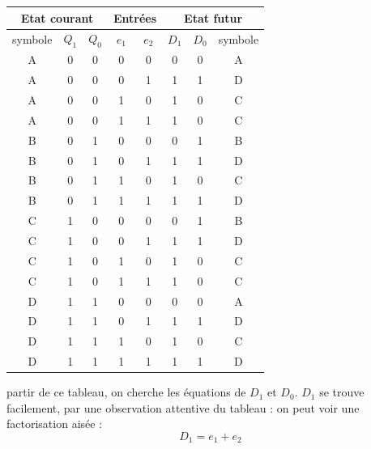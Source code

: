\documentclass[a4paper,11pt]{article}
\begin{document}
\begin{solbox}
\begin{center}
      \begin{tabular}{|c|c|c|c|c||c|c|c|}
          \hline
          \multicolumn{3}{|c|}{Etat courant} & \multicolumn{2}{c||}{Entrées} & \multicolumn{3}{c|}{Etat futur} \\ \hline
          symbole  & $Q_1$ & $Q_0$ & $e_1$ & $e_2$ & $D_1$ & $D_0$ & symbole  \\ \hline \hline
          A & 0 & 0 & 0 & 0 & 0 & 0  & A \\ \hline
          A & 0 & 0 & 0 & 1 & 1 & 1 & D  \\ \hline
          A & 0 & 0 & 1 & 0 & 1 & 0 & C\\ \hline
          A & 0 & 0 & 1 & 1 & 1 & 0 & C\\ \hline \hline
          B & 0 & 1 & 0 & 0 & 0 & 1  & B\\ \hline
          B & 0 & 1 & 0 & 1 & 1 & 1  & D\\ \hline
          B & 0 & 1 & 1 & 0 & 1 & 0  & C\\ \hline
          B & 0 & 1 & 1 & 1 & 1 & 1  & D\\ \hline \hline
          C & 1 & 0 & 0 & 0 & 0 & 1  & B\\ \hline
          C & 1 & 0 & 0 & 1 & 1 & 1  & D\\ \hline
          C & 1 & 0 & 1 & 0 & 1 & 0  & C\\ \hline
          C & 1 & 0 & 1 & 1 & 1 & 0  & C\\ \hline \hline
          D & 1 & 1 & 0 & 0 & 0 & 0  & A\\ \hline
          D & 1 & 1 & 0 & 1 & 1 & 1  & D\\ \hline
          D & 1 & 1 & 1 & 0 & 1 & 0  & C\\ \hline
          D & 1 & 1 & 1 & 1 & 1 & 1  & D\\ \hline
      \end{tabular}
\end{center}

partir de ce tableau, on cherche les équations de $D_1$ et $D_0$. $D_1$ se trouve facilement, par une observation attentive du tableau : on peut voir une factorisation aisée :
$$D_1=e_1+e_2$$
\end{solbox}
\end{document}
